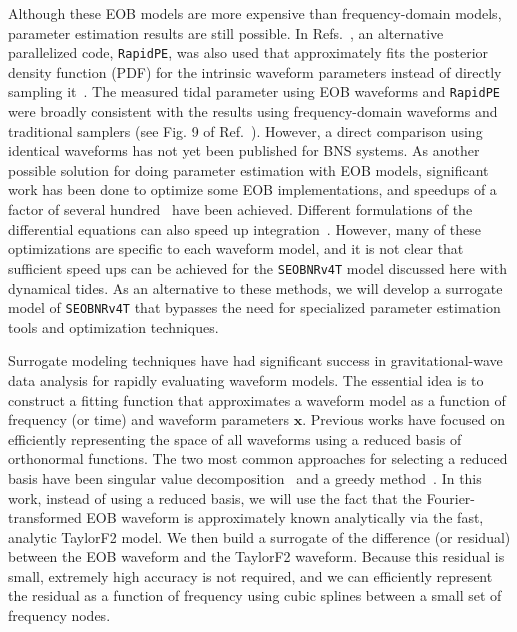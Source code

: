 \documentclass[prd,aps,letter,twocolumn,floatfix,notitlepage,nofootinbib]{revtex4-1}
\def\bx{\mathbf{x}}
\begin{document}
Although these EOB models are more expensive than frequency-domain models, parameter estimation results are still possible. In Refs.~\cite{BNSPE, O2Catalog}, an alternative parallelized code, \texttt{RapidPE}, was also used that approximately fits the posterior density function (PDF) for the intrinsic waveform parameters instead of directly sampling it~\cite{PankowBradyOchsner2015, LangeOshaughnessyRizzo2018}. 
The measured tidal parameter using EOB waveforms and \texttt{RapidPE} were broadly consistent with the results using frequency-domain waveforms and traditional samplers (see Fig. 9 of Ref.~\cite{O2Catalog}). However, a direct comparison using identical waveforms has not yet been published for BNS systems.
As another possible solution for doing parameter estimation with EOB models, significant work has been done to optimize some EOB implementations, and speedups of a factor of several hundred~\cite{DevineEtienneMcWilliams2016} have been achieved. Different formulations of the differential equations can also speed up integration~\cite{NagarNettegno2018}. However, many of these optimizations are specific to each waveform model, and it is not clear that sufficient speed ups can be achieved for the \texttt{SEOBNRv4T} model discussed here with dynamical tides. As an alternative to these methods, we will develop a surrogate model of \texttt{SEOBNRv4T} that bypasses the need for specialized parameter estimation tools and optimization techniques. 

Surrogate modeling techniques have had significant success in gravitational-wave data analysis for rapidly evaluating waveform models. The essential idea is to construct a fitting function that approximates a waveform model as a function of frequency (or time) and waveform parameters $\bx$. Previous works have focused on efficiently representing the space of all waveforms using a reduced basis of orthonormal functions. The two most common approaches for selecting a reduced basis have been singular value decomposition~\cite{Puerrer2014, Puerrer2015} and a greedy method~\cite{FieldGalleyHesthaven2014, LackeyBernuzziGalley2017, BlackmanFieldGalley2015, BlackmanFieldScheel2017a, BlackmanFieldScheel2017b}. In this work, instead of using a reduced basis, we will use the fact that the Fourier-transformed EOB waveform is approximately known analytically via the fast, analytic TaylorF2 model. We then build a surrogate of the difference (or residual) between the EOB waveform and the TaylorF2 waveform. Because this residual is small, extremely high accuracy is not required, and we can efficiently represent the residual as a function of frequency using cubic splines between a small set of frequency nodes.
\end{document}
